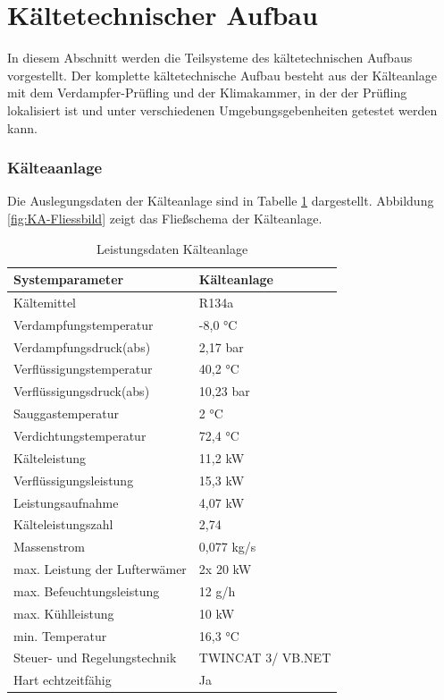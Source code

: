 \section{Kältetechnischer Aufbau}
\label{sec:Kältetechnischer Aufbau}

In diesem Abschnitt werden die Teilsysteme des kältetechnischen Aufbaus vorgestellt. Der komplette kältetechnische Aufbau besteht aus der Kälteanlage mit dem Verdampfer-Prüfling und der Klimakammer, in der der Prüfling lokalisiert ist und unter verschiedenen Umgebungsgebenheiten getestet werden kann.

\subsubsection{Kälteaanlage}
\label{subsec:Kälteanlage}



Die Auslegungsdaten der Kälteanlage sind in Tabelle \ref{tab:Parameter KK} dargestellt. Abbildung \ref{fig:KA-Fliessbild}  zeigt das Fließschema der Kälteanlage. 



\begin{table}[htb]
\centering
\caption{Leistungsdaten Kälteanlage}\vspace{6pt}
\label{tab:Parameter KK}
\begin{tabular}{ll}
\hline 
\textbf{Systemparameter} & \textbf{Kälteanlage} \\ 
\hline 
\hline
Kältemittel & R134a\\
\hline
Verdampfungstemperatur & -8,0 °C\\
\hline
Verdampfungsdruck(abs) & 2,17 bar\\
\hline
Verflüssigungstemperatur & 40,2 °C\\
\hline
Verflüssigungsdruck(abs) & 10,23 bar\\
\hline
Sauggastemperatur & 2 °C\\
\hline
Verdichtungstemperatur &72,4 °C\\
Kälteleistung & 11,2 kW \\ 
\hline 
Verflüssigungsleistung & 15,3 kW\\
\hline
Leistungsaufnahme & 4,07 kW \\ 
\hline
Kälteleistungszahl & 2,74\\
\hline 
Massenstrom & 0,077 kg/s \\ 
\hline 
max. Leistung der Lufterwämer & 2x 20 kW \\ 
\hline 
max. Befeuchtungsleistung & 12 g/h \\ 
\hline 
max. Kühlleistung & 10 kW \\ 
\hline 
min. Temperatur & 16,3 °C \\ 
\hline 
Steuer- und Regelungstechnik & TWINCAT 3/ VB.NET \\ 
\hline 
Hart echtzeitfähig & Ja \\ 
\hline 
\hline 
\end{tabular} 
\end{table}

